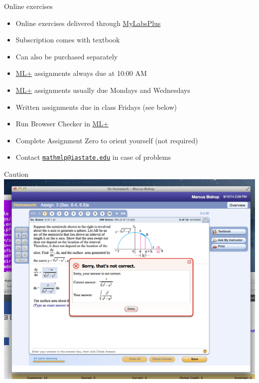 \documentclass[xcolor=dvipsnames]{beamer}
\theoremstyle{definition}
\begin{document}
\begin{frame}{Online exercises}
\begin{itemize}
\item Online exercises delivered through
\href{http://iastate.mylabsplus.com}{\color{blue} MyLabsPlus}
\item Subscription comes with textbook
\item Can also be purchased separately
\item
\href{http://iastate.mylabsplus.com}{\color{blue}ML+}
assignments always due at 10:00 AM
\item 
\href{http://iastate.mylabsplus.com}{\color{blue}ML+}
assignments usually due Mondays and Wednesdays
\item Written assignments due in class Fridays (see below)
\item Run Browser Checker in
\href{http://iastate.mylabsplus.com}{\color{blue}ML+}
\item Complete Assignment Zero to orient yourself (not required)
\item Contact
\href{mailto://mathmlp@iastate.edu}{\color{blue}\tt mathmlp@iastate.edu}
in case of problems
\end{itemize}
\end{frame}

\begin{frame}{Caution}
\includegraphics[scale=.4]{MLPError}
\end{frame}
\end{document}
